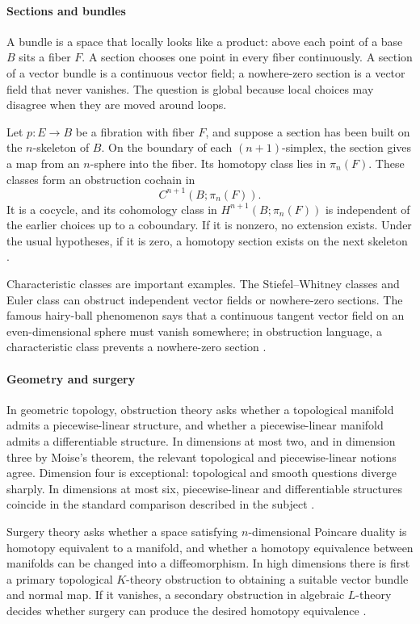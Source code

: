 \paragraph{Sections and bundles}
A bundle is a space that locally looks like a product: above each point of a base $B$ sits a fiber $F$. A section chooses one point in every fiber continuously. A section of a vector bundle is a continuous vector field; a nowhere-zero section is a vector field that never vanishes. The question is global because local choices may disagree when they are moved around loops.

Let $p:E\to B$ be a fibration with fiber $F$, and suppose a section has been built on the $n$-skeleton of $B$. On the boundary of each $(n+1)$-simplex, the section gives a map from an $n$-sphere into the fiber. Its homotopy class lies in $\pi_n(F)$. These classes form an obstruction cochain in
\[
C^{n+1}(B;\pi_n(F)).
\]
It is a cocycle, and its cohomology class in $H^{n+1}(B;\pi_n(F))$ is independent of the earlier choices up to a coboundary. If it is nonzero, no extension exists. Under the usual hypotheses, if it is zero, a homotopy section exists on the next skeleton \cite{obstruction_theory_ref2}.

Characteristic classes are important examples. The Stiefel--Whitney classes and Euler class can obstruct independent vector fields or nowhere-zero sections. The famous hairy-ball phenomenon says that a continuous tangent vector field on an even-dimensional sphere must vanish somewhere; in obstruction language, a characteristic class prevents a nowhere-zero section \cite{obstruction_theory_ref3}.

\paragraph{Geometry and surgery}
In geometric topology, obstruction theory asks whether a topological manifold admits a piecewise-linear structure, and whether a piecewise-linear manifold admits a differentiable structure. In dimensions at most two, and in dimension three by Moise's theorem, the relevant topological and piecewise-linear notions agree. Dimension four is exceptional: topological and smooth questions diverge sharply. In dimensions at most six, piecewise-linear and differentiable structures coincide in the standard comparison described in the subject \cite{obstruction_theory_ref4}.

Surgery theory asks whether a space satisfying $n$-dimensional Poincare duality is homotopy equivalent to a manifold, and whether a homotopy equivalence between manifolds can be changed into a diffeomorphism. In high dimensions there is first a primary topological $K$-theory obstruction to obtaining a suitable vector bundle and normal map. If it vanishes, a secondary obstruction in algebraic $L$-theory decides whether surgery can produce the desired homotopy equivalence \cite{obstruction_theory_ref4,obstruction_theory_ref5}.

